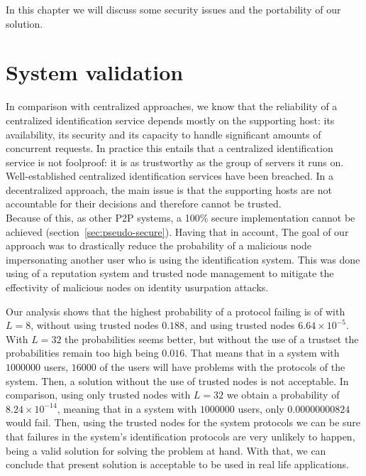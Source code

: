 In this chapter we will discuss some security issues and the portability of our
solution.%

\section{System validation}

In comparison with centralized approaches, we know that the reliability of a
centralized identification service depends mostly on the
supporting host: its availability, its security and its capacity  to handle
significant amounts of concurrent requests. 
In practice this entails that a centralized identification service is not
foolproof: it is as trustworthy as the group of servers it runs on.
Well-established centralized identification services have been breached. %
In a decentralized approach, the main issue is that the supporting hosts are
not accountable for their decisions and therefore cannot be trusted.\\

Because of this, as other P2P systems, a 100\% secure implementation cannot be achieved
(section~\ref{sec:pseudo-secure}).
Having that in account, The goal of our approach was to drastically reduce the probability of a
malicious node impersonating another user who is using the identification
system. This was done using of a reputation system and trusted node management
to mitigate the effectivity of malicious nodes on identity usurpation attacks.

Our analysis shows that the highest probability of a protocol failing is of
with $L=8$, without using trusted nodes $0.188$, and using trusted nodes $6.64
\times 10^{-5}$. With $L=32$ the probabilities seems better, but without the use
of a trustset the probabilities remain too high being $0.016$. That means that
in a system with $1000000$ users, $16000$ of the users will have problems with
the protocols of the system. Then, a solution without the use of trusted nodes
is not acceptable. In comparison, using
only trusted nodes with $L=32$ we obtain a probability of $8.24 \times
10^{-14}$, meaning that in a system with $1000000$ users,
only $0.00000000824$ would fail.
Then, using the trusted nodes for the system protocols we can be sure that failures in the
system's identification protocols are very unlikely to happen, being a valid
solution for solving the problem at hand.
With that, we can conclude that present solution is acceptable to be
used in real life applications.


